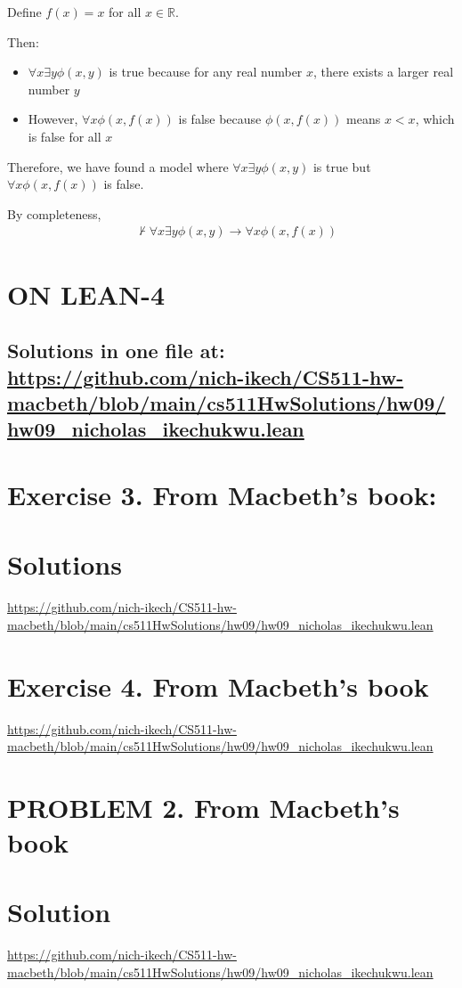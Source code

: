 \documentclass{article}
\begin{document}
\vspace{1em}
Define $f(x) = x$ for all $x \in \mathbb{R}$.

\vspace{1em}
Then:
\begin{itemize}
\item $\forall x \exists y \phi(x,y)$ is true because for any real number $x$, there exists a larger real number $y$
\item However, $\forall x \phi(x,f(x))$ is false because $\phi(x,f(x))$ means $x < x$, which is false for all $x$
\end{itemize}

Therefore, we have found a model where $\forall x \exists y \phi(x,y)$ is true but $\forall x \phi(x,f(x))$ is false.

By completeness, 
\[\begin{aligned}
    & \not \vdash \forall x \exists y \phi(x,y) \rightarrow \forall x \phi(x,f(x))
\end{aligned}\]

\newpage




\section*{ON LEAN-4}
\subsection*{Solutions in one file at: 
\url{https://github.com/nich-ikech/CS511-hw-macbeth/blob/main/cs511HwSolutions/hw09/hw09_nicholas_ikechukwu.lean}}

\newpage

\section*{Exercise 3. From Macbeth’s book:}
\section*{Solutions}
\url{https://github.com/nich-ikech/CS511-hw-macbeth/blob/main/cs511HwSolutions/hw09/hw09_nicholas_ikechukwu.lean}

\newpage

\section*{Exercise 4. From Macbeth's book}

\url{https://github.com/nich-ikech/CS511-hw-macbeth/blob/main/cs511HwSolutions/hw09/hw09_nicholas_ikechukwu.lean}

\newpage

\section*{PROBLEM 2. From Macbeth's book}
\section*{Solution}

\url{https://github.com/nich-ikech/CS511-hw-macbeth/blob/main/cs511HwSolutions/hw09/hw09_nicholas_ikechukwu.lean}
\end{document}

